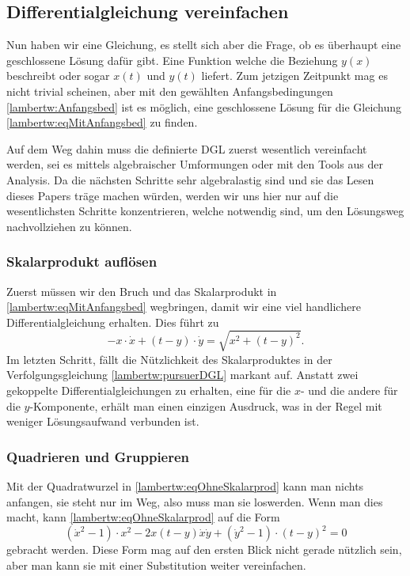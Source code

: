 \subsection{Differentialgleichung vereinfachen
	\label{lambertw:subsection:DGLvereinfach}}
Nun haben wir eine Gleichung, es stellt sich aber die Frage, ob es überhaupt eine geschlossene Lösung dafür gibt. Eine Funktion welche die Beziehung \(y(x)\) beschreibt oder sogar \(x(t)\) und \(y(t)\) liefert. Zum jetzigen Zeitpunkt mag es nicht trivial scheinen, aber mit den gewählten Anfangsbedingungen \eqref{lambertw:Anfangsbed} ist es möglich, eine geschlossene Lösung für die Gleichung \eqref{lambertw:eqMitAnfangsbed} zu finden.

Auf dem Weg dahin muss die definierte DGL zuerst wesentlich vereinfacht werden, sei es mittels algebraischer Umformungen oder mit den Tools aus der Analysis. Da die nächsten Schritte sehr algebralastig sind und sie das Lesen dieses Papers träge machen würden, werden wir uns hier nur auf die wesentlichsten Schritte konzentrieren, welche notwendig sind, um den Lösungsweg nachvollziehen zu können.

\subsubsection{Skalarprodukt auflösen
	\label{lambertw:subsubsection:SkalProdAufl}}
Zuerst müssen wir den Bruch und das Skalarprodukt in \eqref{lambertw:eqMitAnfangsbed} wegbringen, damit wir eine viel handlichere Differentialgleichung erhalten. Dies führt zu
\begin{equation}
		-x \cdot \dot{x} + (t-y) \cdot \dot{y}
		= \sqrt{x^2 + (t-y)^2}.
		\label{lambertw:eqOhneSkalarprod}
\end{equation}
Im letzten Schritt, fällt die Nützlichkeit des Skalarproduktes in der Verfolgungsgleichung \eqref{lambertw:pursuerDGL} markant auf. Anstatt zwei gekoppelte Differentialgleichungen zu erhalten, eine für die \(x\)- und die andere für die \(y\)-Komponente, erhält man einen einzigen Ausdruck, was in der Regel mit weniger Lösungsaufwand verbunden ist.

\subsubsection{Quadrieren und Gruppieren
	\label{lambertw:subsubsection:QuadUndGrup}}
Mit der Quadratwurzel in \eqref{lambertw:eqOhneSkalarprod} kann man nichts anfangen, sie steht nur im Weg, also muss man sie loswerden. Wenn man dies macht, kann \eqref{lambertw:eqOhneSkalarprod} auf die Form  
\begin{equation}
	\left(\dot{x}^2-1\right) \cdot x^2 -2x \left(t-y\right) \dot{x}\dot{y} + \left(\dot{y}^2-1\right) \cdot \left(t-y\right)^2
	=0
	\label{lambertw:eqOhneWurzel}
\end{equation}
gebracht werden.
Diese Form mag auf den ersten Blick nicht gerade nützlich sein, aber man kann sie mit einer Substitution weiter vereinfachen.


